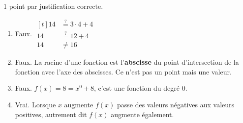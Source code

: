 %
%
    1 point par justification correcte.
    \begin{enumerate}
        \item Faux.
        $\begin{aligned}[t]
            14 &\stackrel{?}{=} 3\cdot 4+ 4\\
            14 &\stackrel{?}{=} 12 + 4\\
            14 &\ne 16
        \end{aligned}$
        \item Faux. La racine d'une fonction est l'\textbf{abscisse} du point d'intersection de la fonction avec l'axe des abscisses. Ce n'est pas un point mais une valeur.
        \item Faux. $f(x)= 8 = x^0 + 8$, c'est une fonction du degré 0.
        \item Vrai. Lorsque $x$ augmente $f(x)$ passe des valeurs négatives aux valeurs positives, autrement dit $f(x)$ augmente également.
    \end{enumerate}
